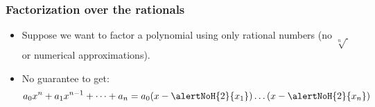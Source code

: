 \begin{frame}
\frametitle{Factorization over the rationals}
\begin{itemize}
\item Suppose we want to factor a polynomial using only rational numbers (no $\sqrt[n]{~}$ or numerical approximations).
\item No guarantee to get:
\[
a_0 x^{n}+a_1x^{n-1}+\dots + a_n=a_0 (x- \alertNoH{2}{x_1} )\dots (x-\alertNoH{2}{ x_n} )
\]
\end{itemize}
\end{frame}